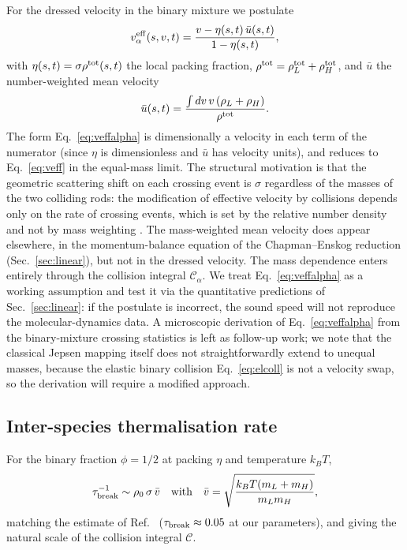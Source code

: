 \documentclass[aps,pre,twocolumn,superscriptaddress,longbibliography,floatfix]{revtex4-2}
\begin{document}
For the dressed velocity in the binary mixture we postulate
\begin{equation}
v^{\rm eff}_\alpha(s,v,t)
= \frac{v - \eta(s,t)\,\bar u(s,t)}{1 - \eta(s,t)},
\label{eq:veffalpha}
\end{equation}
with $\eta(s,t)=\sigma\rho^{\rm tot}(s,t)$ the local packing
fraction, $\rho^{\rm tot}=\rho_L^{\rm tot}+\rho_H^{\rm tot}$,
and $\bar u$ the number-weighted mean velocity
\begin{equation}
\bar u(s,t)
= \frac{\int dv\,v\,(\rho_L + \rho_H)}{\rho^{\rm tot}}.
\label{eq:ubar}
\end{equation}
The form Eq.~\eqref{eq:veffalpha} is dimensionally a velocity
in each term of the numerator (since $\eta$ is dimensionless
and $\bar u$ has velocity units), and reduces to
Eq.~\eqref{eq:veff} in the equal-mass limit.
The structural motivation is that the geometric scattering shift
on each crossing event is $\sigma$ regardless of the masses of
the two colliding rods: the modification of effective
velocity by collisions depends only on the rate of crossing
events, which is set by the relative number density and not by
mass weighting \cite{DoyonSpohn2017,BDS1983}. The mass-weighted
mean velocity does appear elsewhere, in the momentum-balance
equation of the Chapman--Enskog reduction
(Sec.~\ref{sec:linear}), but not in the dressed velocity. The mass dependence enters
entirely through the collision integral $\mathcal{C}_\alpha$.
We treat Eq.~\eqref{eq:veffalpha} as a working assumption and
test it via the quantitative predictions of
Sec.~\ref{sec:linear}: if the postulate is incorrect, the sound
speed will not reproduce the molecular-dynamics data. A
microscopic derivation of Eq.~\eqref{eq:veffalpha} from the
binary-mixture crossing statistics is left as follow-up work;
we note that the classical Jepsen mapping itself does not
straightforwardly extend to unequal masses, because the elastic
binary collision Eq.~\eqref{eq:elcoll} is not a velocity swap,
so the derivation will require a modified approach.

\subsection{Inter-species thermalisation rate}

For the binary fraction $\phi=1/2$ at packing $\eta$ and
temperature $k_BT$,
\begin{equation}
\tau_{\rm break}^{-1} \sim \rho_0\,\sigma\,\bar v
\quad\text{with}\quad
\bar v = \sqrt{\frac{k_BT(m_L+m_H)}{m_L m_H}},
\end{equation}
matching the estimate of Ref.~\cite{PaperIII}
($\tau_{\rm break}\approx 0.05$ at our parameters), and giving
the natural scale of the collision integral $\mathcal{C}$.
\end{document}
